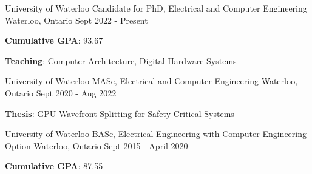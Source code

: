 

\begin{cventries}

  \cventry
    {University of Waterloo} %
    {Candidate for PhD, Electrical and Computer Engineering} %
    {Waterloo, Ontario} %
    {Sept 2022 - Present} %
    {
        \begin{cvitems} %
            \item \textbf{Cumulative GPA}: 93.67
            \item \textbf{Teaching}: Computer Architecture, Digital Hardware Systems
          \end{cvitems}
    }
    
  \cventry
    {University of Waterloo} %
    {MASc, Electrical and Computer Engineering} %
    {Waterloo, Ontario} %
    {Sept 2020 - Aug 2022} %
    {
      \begin{cvitems} %
        \item \textbf{Thesis}: \href{https://uwspace.uwaterloo.ca/handle/10012/18872}{GPU Wavefront Splitting for Safety-Critical Systems}
      \end{cvitems}
    }
  
  \cventry
    {University of Waterloo} %
    {BASc, Electrical Engineering with Computer Engineering Option} %
    {Waterloo, Ontario} %
    {Sept 2015 - April 2020} %
    {
      \begin{cvitems} %
        \item \textbf{Cumulative GPA}: 87.55
      \end{cvitems}
    }

\end{cventries}

